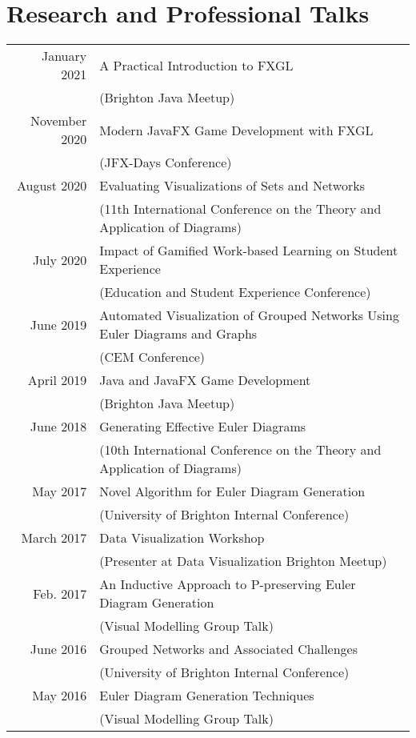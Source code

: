 \documentclass[a4paper,11pt]{article} %
\begin{document}

\section{Research and Professional Talks}

\begin{center}
\begin{tabular}{rl}

January 2021 & A Practical Introduction to FXGL\\ & (Brighton Java Meetup) \\

November 2020 & Modern JavaFX Game Development with FXGL\\ & (JFX-Days Conference) \\

August 2020 & Evaluating Visualizations of Sets and Networks\\ & (11th International Conference on the Theory and Application of Diagrams) \\

July 2020 & Impact of Gamified Work-based Learning on Student Experience\\ & (Education and Student Experience Conference)\\

June 2019 & Automated Visualization of Grouped Networks Using Euler Diagrams and Graphs\\ & (CEM Conference) \\

April 2019 & Java and JavaFX Game Development\\ & (Brighton Java Meetup) \\

June 2018 & Generating Effective Euler Diagrams\\ & (10th International Conference on the Theory and Application of Diagrams) \\

May 2017 & Novel Algorithm for Euler Diagram Generation\\ & (University of Brighton Internal Conference) \\

March 2017 & Data Visualization Workshop\\ & (Presenter at Data Visualization Brighton Meetup) \\

Feb. 2017 & An Inductive Approach to P-preserving Euler Diagram Generation\\ & (Visual Modelling Group Talk) \\

June 2016 & Grouped Networks and Associated Challenges\\ & (University of Brighton Internal Conference) \\

May 2016 & Euler Diagram Generation Techniques\\ & (Visual Modelling Group Talk) \\

\end{tabular}
\end{center}
\end{document}
